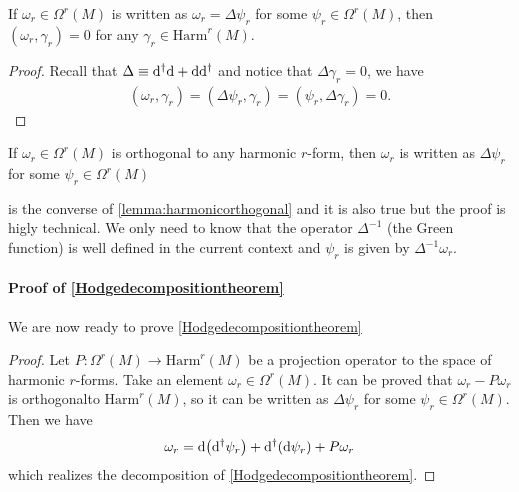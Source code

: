 \documentclass[10pt]{article}
\begin{document}
\begin{lemma}\label{lemma:harmonicorthogonal}
    If $\omega_r\in\Omega^r(M)$ is written as $\omega_r=\Delta\psi_r$ for some $\psi_r\in\Omega^r(M)$, then $(\omega_r,\gamma_r)=0$ for any $\gamma_r\in\mathrm{Harm}^r (M)$.
\end{lemma}
\begin{proof}
    Recall that $\Delta\equiv\mathrm{d}^\dagger\mathrm{d}+\mathrm{d}\mathrm{d}^\dagger$ and notice that $\Delta\gamma_r=0$, we have
    \begin{align}
        (\omega_r,\gamma_r)=(\Delta\psi_r,\gamma_r)=(\psi_r,\Delta\gamma_r)=0.
    \end{align}
\end{proof}
\begin{lemma}\label{lemma:converseharmonicorthogonal}
    If $\omega_r\in\Omega^r(M)$ is orthogonal to any harmonic $r$-form, then $\omega_r$ is written as $\Delta\psi_r$ for some $\psi_r\in\Omega^r(M)$
\end{lemma}
 is the converse of \cref{lemma:harmonicorthogonal} and it is also true but the proof is higly technical.
We only need to know that the operator $\Delta^{-1}$ (the Green function) is well defined in the current context and $\psi_r$ is given by $\Delta^{-1}\omega_r$.
\paragraph{Proof of \cref{Hodgedecompositiontheorem}}
We are now ready to prove \cref{Hodgedecompositiontheorem}
\begin{proof}
    Let $P:\Omega^r(M)\to\mathrm{Harm}^r(M)$ be a projection operator to the space of harmonic $r$-forms\snm.
    Take an element $\omega_r\in\Omega^r(M)$.
    It can be proved that $\omega_r-P\omega_r$ is orthogonal\snm to $\mathrm{Harm}^r(M)$, so it can be written as $\Delta\psi_r$ for some $\psi_r\in\Omega^r(M)$.
    Then we have
    \begin{align}
        \omega_r=\dd(\mathrm{d}^\dagger\psi_r)+\mathrm{d}^\dagger(\dd{\psi_r})+P\omega_r\label{eq:hodgedecompositionrealization}
    \end{align}
    which realizes the decomposition of \cref{Hodgedecompositiontheorem}.
\end{proof}
\end{document}
